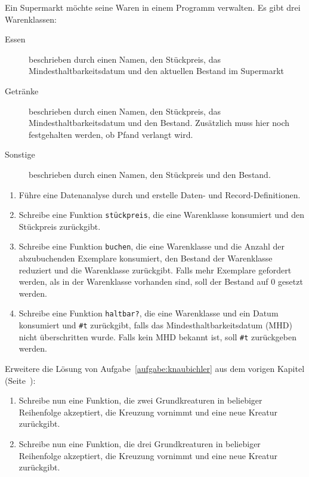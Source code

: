 \begin{aufgabe}
  Ein Supermarkt möchte seine Waren in einem Programm verwalten. Es gibt
  drei Warenklassen:
  \begin{description}
  \item[Essen] beschrieben durch einen Namen, den Stückpreis, das Mindesthaltbarkeitsdatum
    und den aktuellen Bestand im Supermarkt
  \item[Getränke] beschrieben durch einen Namen, den Stückpreis, das Mindesthaltbarkeitsdatum
    und den Bestand. Zusätzlich muss hier noch festgehalten werden, ob Pfand verlangt wird.
  \item[Sonstige] beschrieben durch einen Namen, den Stückpreis und den Bestand.
  \end{description}

  
  \begin{enumerate}
  \item Führe eine Datenanalyse durch und erstelle Daten- und 
    Record-Definitionen.
  \item Schreibe eine Funktion \texttt{stückpreis}, die eine Warenklasse
    konsumiert und den Stückpreis zurückgibt.
  \item Schreibe eine Funktion \texttt{buchen}, die eine Warenklasse und die Anzahl der
    abzubuchenden Exemplare konsumiert, den Bestand der Warenklasse reduziert und die
    Warenklasse zurückgibt. Falls mehr Exemplare gefordert werden, als in der Warenklasse
    vorhanden sind, soll der Bestand auf 0 gesetzt werden.
  \item Schreibe eine Funktion \texttt{haltbar?}, die eine
    Warenklasse und ein Datum konsumiert und \texttt{\#t} zurückgibt, falls das
    Mindesthaltbarkeitsdatum (MHD) nicht überschritten wurde. Falls kein MHD bekannt ist,
    soll \texttt{\#t} zurückgeben werden.
  \end{enumerate}
\end{aufgabe}

\begin{aufgabe}
  \label{aufgabe:knaubichler2}
  Erweitere die Lösung von Aufgabe~\ref{aufgabe:knaubichler} aus
  dem vorigen Kapitel (Seite~\pageref{aufgabe:knaubichler}):
  
  \begin{enumerate}
  \item Schreibe nun eine Funktion, die zwei
    Grundkreaturen in beliebiger Reihenfolge akzeptiert, die Kreuzung
    vornimmt und eine neue Kreatur zurückgibt.
    
  \item Schreibe nun eine
    Funktion, die drei Grundkreaturen in beliebiger Reihenfolge
    akzeptiert, die Kreuzung vornimmt und eine neue Kreatur
    zurückgibt.
  \end{enumerate}
\end{aufgabe}     

